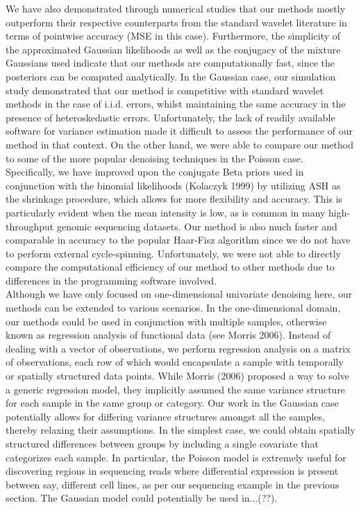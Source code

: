 \documentclass[12pt]{article}
\begin{document}
We have also demonstrated through numerical studies that our methods mostly outperform their respective counterparts from the standard wavelet literature in terms of pointwise accuracy (MSE in this case). Furthermore, the simplicity of the approximated Gaussian likelihoods as well as the conjugacy of the mixture Gaussians used indicate that our methods are computationally fast, since the posteriors can be computed analytically. In the Gaussian case, our simulation study demonstrated that our method is competitive with standard wavelet methods in the case of i.i.d. errors, whilst maintaining the same accuracy in the presence of heteroskedastic errors. Unfortunately, the lack of readily available software for variance estimation made it difficult to assess the performance of our method in that context. On the other hand, we were able to compare our method to some of the more popular denoising techniques in the Poisson case. Specifically, we have improved upon the conjugate Beta priors used in conjunction with the binomial likelihoods (Kolaczyk 1999) by utilizing ASH as the shrinkage procedure, which allows for more flexibility and accuracy. This is particularly evident when the mean intensity is low, as is common in many high-throughput genomic sequencing datasets. Our method is also much faster and comparable in accuracy to the popular Haar-Fisz algorithm since we do not have to perform external cycle-spinning. Unfortunately, we were not able to directly compare the computational efficiency of our method to other methods due to differences in the programming software involved.\bigskip\\
Although we have only focused on one-dimensional univariate denoising here, our methods can be extended to various scenarios. In the one-dimensional domain, our methods could be used in conjunction with multiple samples, otherwise known as regression analysis of functional data (see Morris 2006). Instead of dealing with a vector of observations, we perform regression analysis on a matrix of observations, each row of which would encapsulate a sample with temporally or spatially structured data points. While Morris (2006) proposed a way to solve a generic regression model, they implicitly assumed the same variance structure for each sample in the same group or category. Our work in the Gaussian case potentially allows for differing variance structures amongst all the samples, thereby relaxing their assumptions. In the simplest case, we could obtain spatially structured differences between groups by including a single covariate that categorizes each sample. In particular, the Poisson model is extremely useful for discovering regions in sequencing reads where differential expression is present between say, different cell lines, as per our sequencing example in the previous section. The Gaussian model could potentially be used in...(??).\bigskip\\
\end{document}

